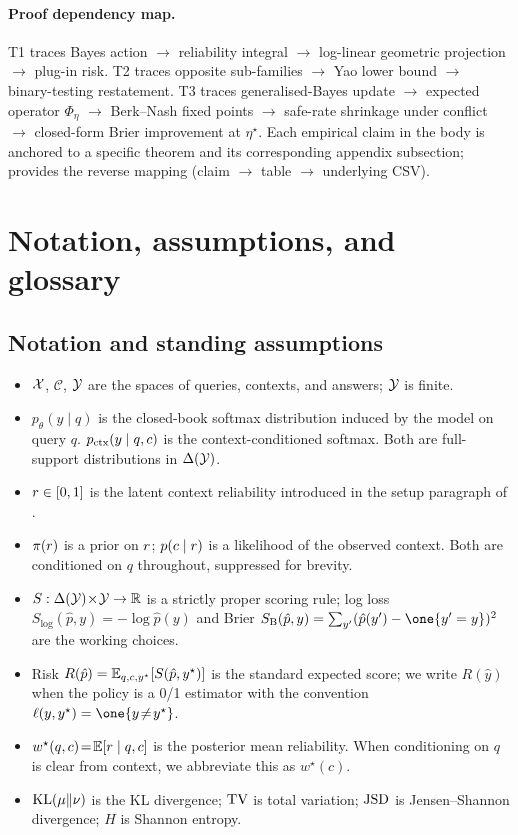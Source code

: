 \paragraph{Proof dependency map.}
T1 traces Bayes action $\to$ reliability integral $\to$ log-linear
geometric projection $\to$ plug-in risk.  T2 traces opposite
sub-families $\to$ Yao lower bound $\to$ binary-testing
restatement.  T3 traces generalised-Bayes update $\to$ expected
operator $\Phi_\eta$ $\to$ Berk--Nash fixed points $\to$ safe-rate
shrinkage under conflict $\to$ closed-form Brier improvement at
$\eta^\star$.  Each empirical claim in the body is anchored to a
specific theorem and its corresponding appendix subsection;
 provides the reverse mapping (claim
$\to$ table $\to$ underlying CSV).


\section{Notation, assumptions, and glossary}
\label{app:letter-A}

\subsection{Notation and standing assumptions}
\label{app:notation}

\begin{itemize}[leftmargin=1.2em,itemsep=2pt]
\item $\mathcal{X}$, $\mathcal{C}$, $\mathcal{Y}$ are the spaces of queries, contexts, and
answers; $\mathcal{Y}$ is finite.
\item $p_\theta(y\mid q)$ is the closed-book softmax distribution induced by
the model on query $q$.  $p_{\mathrm{ctx}}(y\mid q,c)$ is the context-conditioned
softmax.  Both are full-support distributions in $\Delta(\mathcal{Y})$.
\item $r\in[0,1]$ is the latent context reliability introduced in the
setup paragraph of .
\item $\pi(r)$ is a prior on $r$; $p(c\mid r)$ is a likelihood of
the observed context.  Both are conditioned on $q$ throughout, suppressed for
brevity.
\item $S:\Delta(\mathcal{Y})\!\times\!\mathcal{Y}\to\mathbb{R}$ is a strictly proper scoring rule;
log loss $S_{\log}(\hat p,y)=-\log\hat p(y)$ and Brier
$S_{\mathrm{B}}(\hat p,y)=\sum_{y'}(\hat p(y')-\one{y'=y})^2$ are the working
choices.
\item Risk $R(\hat p)=\mathbb{E}_{q,c,y^\star}[S(\hat p,y^\star)]$ is the standard expected score; we write $R(\hat y)$
when the policy is a 0/1 estimator with the convention $\ell(y,y^\star)=\one{y\!\neq\!y^\star}$.
\item $w^\star(q,c)\!=\!\mathbb{E}[r\mid q,c]$ is the posterior mean reliability.
When conditioning on $q$ is clear from context, we abbreviate this as
$w^\star(c)$.
\item $\operatorname{KL}(\mu\|\nu)$ is the KL divergence; $\operatorname{TV}$ is total variation;
$\operatorname{JSD}$ is Jensen--Shannon divergence; $H$ is Shannon entropy.
\end{itemize}

